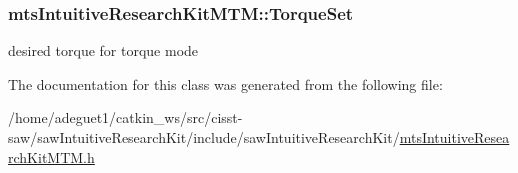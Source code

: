 \hypertarget{classmts_intuitive_research_kit_m_t_m_a78cce153418a304d9be36458e2252c4f}{
\subsubsection[{Torque\-Set}]{ mts\-Intuitive\-Research\-Kit\-M\-T\-M\-::\-Torque\-Set\hspace{0.3cm}{\ttfamily [protected]}}}\label{classmts_intuitive_research_kit_m_t_m_a78cce153418a304d9be36458e2252c4f}


desired torque for torque mode 



The documentation for this class was generated from the following file\-:\begin{DoxyCompactItemize}
\item 
/home/adeguet1/catkin\-\_\-ws/src/cisst-\/saw/saw\-Intuitive\-Research\-Kit/include/saw\-Intuitive\-Research\-Kit/\hyperlink{mts_intuitive_research_kit_m_t_m_8h}{mts\-Intuitive\-Research\-Kit\-M\-T\-M.\-h}\end{DoxyCompactItemize}
